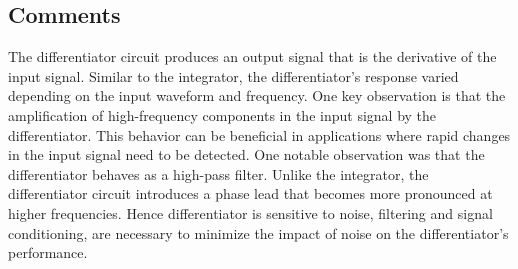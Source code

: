 \documentclass[a4paper, 12pt, english]{article}
\begin{document}
\subsection{Comments}
The differentiator circuit produces an output signal that is the derivative of the input signal. Similar to the integrator, the differentiator's response varied depending on the input waveform and frequency. One key observation is that the amplification of high-frequency components in the input signal by the differentiator. This behavior can be beneficial in applications where rapid changes in the input signal need to be detected. One notable observation was that the differentiator behaves as a high-pass filter.  Unlike the integrator, the differentiator circuit introduces a phase lead that becomes more pronounced at higher frequencies. Hence differentiator is sensitive to noise, filtering and signal conditioning, are necessary to minimize the impact of noise on the differentiator's performance.


\newpage

\patchcmd{\thebibliography}{\section*}{\section}{}{}
\end{document}
